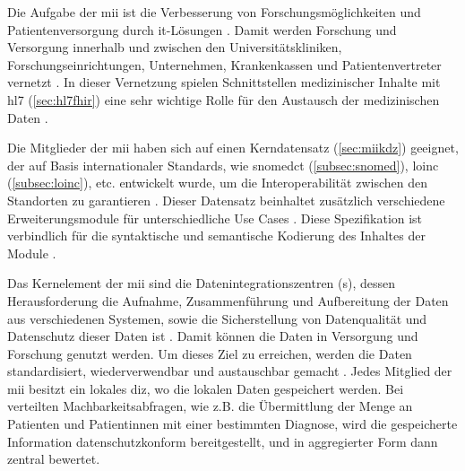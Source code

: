 Die Aufgabe der \ac{mii} ist die Verbesserung von Forschungsmöglichkeiten und Patientenversorgung durch \acs{it}-Lösungen \cite{mii}. Damit werden Forschung und Versorgung innerhalb und zwischen den Universitätskliniken, Forschungseinrichtungen, Unternehmen, Krankenkassen und Patientenvertreter vernetzt \cite{telemedizin, mii}. In dieser Vernetzung spielen Schnittstellen medizinischer Inhalte mit \acs{hl7} (\ref{sec:hl7fhir}) eine sehr wichtige Rolle für den Austausch der medizinischen Daten \cite{telemedizin}. 

Die Mitglieder der \ac{mii} haben sich auf einen Kerndatensatz (\ref{sec:miikdz}) geeignet, der auf Basis internationaler Standards, wie \ac{snomedct} (\ref{subsec:snomed}), \ac{loinc} (\ref{subsec:loinc}), etc. entwickelt wurde, um die Interoperabilität zwischen den Standorten zu garantieren \cite{telemedizin, miikdz}. Dieser Datensatz beinhaltet zusätzlich verschiedene Erweiterungsmodule für unterschiedliche Use Cases \cite{mii}. Diese Spezifikation ist verbindlich für die syntaktische und semantische Kodierung des Inhaltes der Module \cite{icukdz}.

Das Kernelement der \ac{mii} sind die Datenintegrationszentren (s), dessen Herausforderung die Aufnahme, Zusammenführung und Aufbereitung der Daten aus verschiedenen Systemen, sowie die Sicherstellung von Datenqualität und Datenschutz dieser Daten ist \cite{mii, diz}. Damit können die Daten in Versorgung und Forschung genutzt werden. Um dieses Ziel zu erreichen, werden die Daten standardisiert, wiederverwendbar und austauschbar gemacht \cite{diz}. Jedes Mitglied der \ac{mii} besitzt ein lokales \ac{diz}, wo die lokalen Daten gespeichert werden. Bei verteilten Machbarkeitsabfragen, wie z.B. die Übermittlung der Menge an Patienten und Patientinnen mit einer bestimmten Diagnose, wird die gespeicherte Information datenschutzkonform bereitgestellt, und in aggregierter Form dann zentral bewertet.